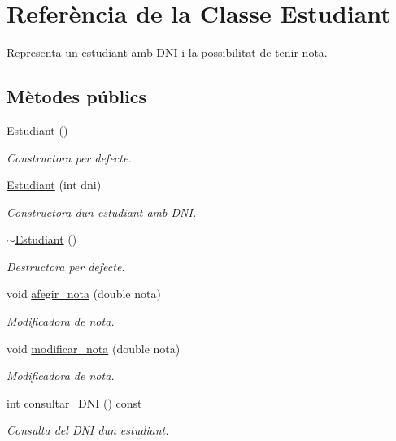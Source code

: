 \hypertarget{class_estudiant}{}\section{Referència de la Classe Estudiant}
\label{class_estudiant}


Representa un estudiant amb D\+NI i la possibilitat de tenir nota.  


\subsection*{Mètodes públics}
\begin{DoxyCompactItemize}
\item 
\hyperlink{class_estudiant_a88f7f46dd946fef9f7a71fdc608afd16}{Estudiant} ()
\begin{DoxyCompactList}\small\item\em Constructora per defecte. \end{DoxyCompactList}\item 
\hyperlink{class_estudiant_ae0a9ebffe2ff8fb6cecc15a909206a1b}{Estudiant} (int dni)
\begin{DoxyCompactList}\small\item\em Constructora d\textquotesingle{}un estudiant amb D\+NI. \end{DoxyCompactList}\item 
\hyperlink{class_estudiant_a2e2bd22924dacfe16acf12b5c31efd01}{$\sim$\+Estudiant} ()
\begin{DoxyCompactList}\small\item\em Destructora per defecte. \end{DoxyCompactList}\item 
void \hyperlink{class_estudiant_a8a2186560dce4ccfc5922d2c98f21305}{afegir\+\_\+nota} (double nota)
\begin{DoxyCompactList}\small\item\em Modificadora de nota. \end{DoxyCompactList}\item 
void \hyperlink{class_estudiant_a5d5eded678c16a864f22477d401a56af}{modificar\+\_\+nota} (double nota)
\begin{DoxyCompactList}\small\item\em Modificadora de nota. \end{DoxyCompactList}\item 
int \hyperlink{class_estudiant_ad37108e53c6c0f1fcb5786e77e1902f5}{consultar\+\_\+\+D\+NI} () const
\begin{DoxyCompactList}\small\item\em Consulta del D\+NI d\textquotesingle{}un estudiant. \end{DoxyCompactList}\item 

\end{DoxyCompactItemize}
